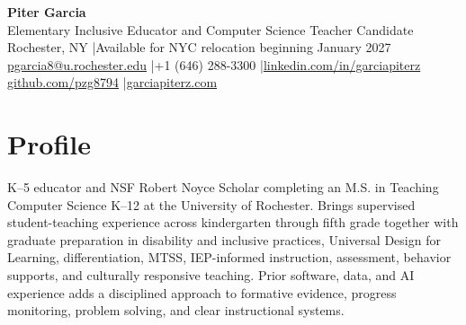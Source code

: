\documentclass[10pt,letterpaper]{article}
\begin{document}
\fontsize{9}{10.5}\selectfont

\begin{center}
  {\Large\bfseries Piter Garcia}\\[1pt]
  {\large Elementary Inclusive Educator and Computer Science Teacher Candidate}\\[2pt]
  Rochester, NY \enspace|\enspace Available for NYC relocation beginning January 2027\\
  \href{mailto:pgarcia8@u.rochester.edu}{pgarcia8@u.rochester.edu}
  \enspace|\enspace +1 (646) 288-3300
  \enspace|\enspace \href{https://linkedin.com/in/garciapiterz}{linkedin.com/in/garciapiterz}\\
  \href{https://github.com/pzg8794}{github.com/pzg8794}
  \enspace|\enspace \href{https://garciapiterz.com}{garciapiterz.com}
\end{center}

\section*{Profile}
K--5 educator and NSF Robert Noyce Scholar completing an M.S. in Teaching
Computer Science K--12 at the University of Rochester. Brings supervised
student-teaching experience across kindergarten through fifth grade together
with graduate preparation in disability and inclusive practices, Universal
Design for Learning, differentiation, MTSS, IEP-informed instruction,
assessment, behavior supports, and culturally responsive teaching. Prior
software, data, and AI experience adds a disciplined approach to formative
evidence, progress monitoring, problem solving, and clear instructional
systems.
\end{document}
